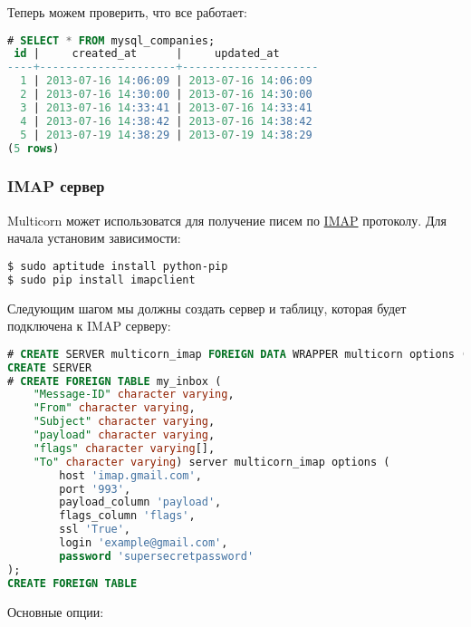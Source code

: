 Теперь можем проверить, что все работает:

\begin{lstlisting}[language=SQL,label=lst:pgmulticorn-rdbms5,caption=Multicorn]
# SELECT * FROM mysql_companies;
 id |     created_at      |     updated_at
----+---------------------+---------------------
  1 | 2013-07-16 14:06:09 | 2013-07-16 14:06:09
  2 | 2013-07-16 14:30:00 | 2013-07-16 14:30:00
  3 | 2013-07-16 14:33:41 | 2013-07-16 14:33:41
  4 | 2013-07-16 14:38:42 | 2013-07-16 14:38:42
  5 | 2013-07-19 14:38:29 | 2013-07-19 14:38:29
(5 rows)
\end{lstlisting}


\subsubsection{IMAP сервер}

Multicorn может использоватся для получение писем по \href{https://ru.wikipedia.org/wiki/IMAP}{IMAP} протоколу. Для начала установим зависимости:

\begin{lstlisting}[language=Bash,label=lst:pgmulticorn-imap1,caption=Multicorn]
$ sudo aptitude install python-pip
$ sudo pip install imapclient
\end{lstlisting}

Следующим шагом мы должны создать сервер и таблицу, которая будет подключена к IMAP серверу:

\begin{lstlisting}[language=SQL,label=lst:pgmulticorn-imap2,caption=Multicorn]
# CREATE SERVER multicorn_imap FOREIGN DATA WRAPPER multicorn options ( wrapper 'multicorn.imapfdw.ImapFdw' );
CREATE SERVER
# CREATE FOREIGN TABLE my_inbox (
    "Message-ID" character varying,
    "From" character varying,
    "Subject" character varying,
    "payload" character varying,
    "flags" character varying[],
    "To" character varying) server multicorn_imap options (
        host 'imap.gmail.com',
        port '993',
        payload_column 'payload',
        flags_column 'flags',
        ssl 'True',
        login 'example@gmail.com',
        password 'supersecretpassword'
);
CREATE FOREIGN TABLE
\end{lstlisting}

Основные опции:

